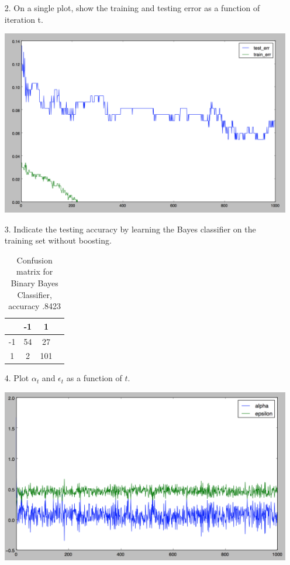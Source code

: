 \documentclass[11pt]{article}
\begin{document}
\begin{enumerate}
\item [2.] On a single plot, show the training and testing error as a function of iteration t.

\includegraphics[scale=.4]{images/p2testtrain.png}

\item[3.] Indicate the testing accuracy by learning the Bayes classifier on the training set without boosting.

\begin{table}[!th]
\centering
\begin{tabular}{|c|c|cl}
\hline
& -1 & 1 \\
\hline
-1 & 54 & 27 \\
1 & 2 & 101 \\
\hline
\end{tabular}
\caption{Confusion matrix for Binary Bayes Classifier, accuracy .8423}
\label{ex:table}
\end{table}


\item[4.] Plot $\alpha_t$ and $\epsilon_t$ as a function of $t$.

\includegraphics[scale=.5]{images/p2params.png}


\end{enumerate}
\end{document}

